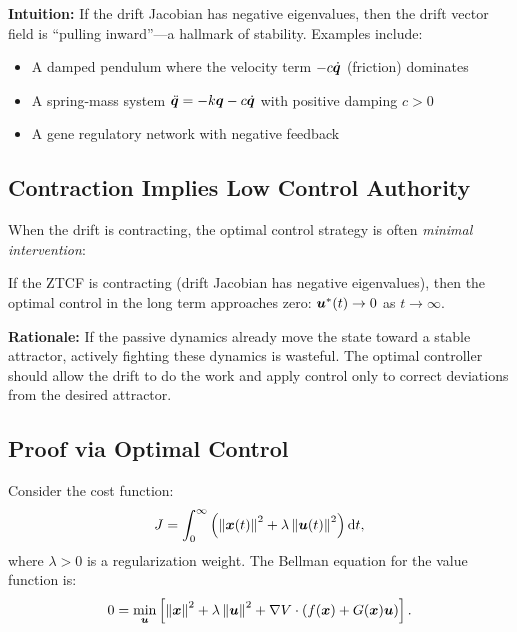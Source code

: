 \noindent\textbf{Intuition:} If the drift Jacobian has negative eigenvalues, then the
drift vector field is ``pulling inward''---a hallmark of stability. Examples include:
\begin{itemize}
\item A damped pendulum where the velocity term $-c\dot{\bm{q}}$ (friction) dominates
\item A spring-mass system $\ddot{\bm{q}} = -k\bm{q} - c\dot{\bm{q}}$ with positive damping $c>0$
\item A gene regulatory network with negative feedback
\end{itemize}

\subsection{Contraction Implies Low Control Authority}

When the drift is contracting, the optimal control strategy is often \emph{minimal intervention}:

\begin{proposition}
\label{prop:ch7:minimal-intervention}
If the ZTCF is contracting (drift Jacobian has negative eigenvalues), then the optimal
control in the long term approaches zero: $\bm{u}^*(t) \to 0$ as $t\to\infty$.
\end{proposition}

\noindent\textbf{Rationale:} If the passive dynamics already move the state toward a stable
attractor, actively fighting these dynamics is wasteful. The optimal controller should allow
the drift to do the work and apply control only to correct deviations from the desired
attractor.

\subsection{Proof via Optimal Control}

Consider the cost function:
\begin{equation}
J = \int_0^\infty \left(\left\lVert \bm{x}(t) \right\rVert^2 + \lambda \left\lVert \bm{u}(t) \right\rVert^2\right) \mathrm{d}t,
\label{eq:ch7:opt-cost}
\end{equation}
where $\lambda>0$ is a regularization weight. The Bellman equation for the value function is:
\begin{equation}
0 = \min_{\bm{u}} \left[\left\lVert \bm{x} \right\rVert^2 + \lambda\left\lVert \bm{u} \right\rVert^2 + \nabla V \cdot (f(\bm{x}) + G(\bm{x})\bm{u})\right].
\label{eq:ch7:bellman}
\end{equation}

